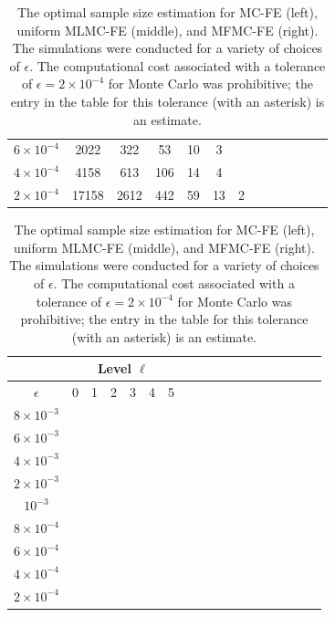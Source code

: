 \begin{table}[ht]
{\begin{tabular}{c|c|c|c|c|c|c|c|c|c|c|c|c|}
			\multicolumn{1}{|c|}{$6\times 10^{-4} $}&2022 &322 &53 &10 &3&\\
                \multicolumn{1}{|c|}{$4\times 10^{-4} $}&4158 &613 &106 &14 &4&\\
                \multicolumn{1}{|c|}{$2\times 10^{-4} $}&17158 &2612 &442 &59 &13 &2\\
			\hline
	\end{tabular}
 \qquad
		\begin{tabular}{c|c|c|c|c|c|c|c|c|c|c|c|c|c|c|c|c|c|}
	    \cline{2-7}	
		&\multicolumn{6}{|c|}{ Level $\ell$}\\
			\hline
			\multicolumn{1}{|c|}{$\epsilon$}&0&1&2&3&4&5\\
			\hline
			\multicolumn{1}{|c|}{$8\times 10^{-3} $}&&&&&&\\
			\multicolumn{1}{|c|}{$6\times 10^{-3} $}&&&&&&\\
			\multicolumn{1}{|c|}{$4\times 10^{-3} $}&&&\\
			\multicolumn{1}{|c|}{$2\times 10^{-3} $}&&&\\
			\multicolumn{1}{|c|}{$10^{-3} $}&&&&&&\\
			\multicolumn{1}{|c|}{$8\times 10^{-4} $}&&&&&&\\
                \multicolumn{1}{|c|}{$6\times 10^{-4} $}&&&&&&\\
			\multicolumn{1}{|c|}{$4\times 10^{-4} $}&&&&&&\\
                \multicolumn{1}{|c|}{$2\times 10^{-4} $}&&&&&&\\
			\hline
	\end{tabular}
 
 }
	\caption{The optimal sample size estimation for MC-FE (left), uniform MLMC-FE (middle), and MFMC-FE (right). The simulations were conducted for a variety of choices of $\epsilon$. The computational cost associated with a tolerance of $\epsilon = 2\times 10^{-4}$ for Monte Carlo was prohibitive; the entry in the table for this tolerance (with an asterisk) is an estimate.}
	\label{Tab:SampleSize_Source_Term}
\end{table}

